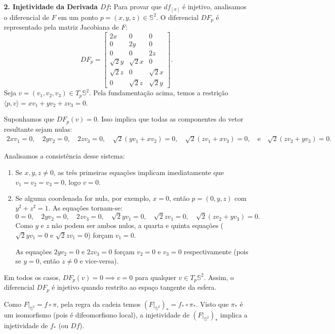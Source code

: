 {	\textbf{2. Injetividade da Derivada $Df$:}
	Para provar que $df_{[x]}$ é injetivo, analisamos o diferencial de $F$ em um ponto $p = (x, y, z) \in \mathbb{S}^2$. O diferencial $DF_p$ é representado pela matriz Jacobiana de $F$:
	\begin{equation*}
		DF_p = \begin{bmatrix} 
			2x & 0 & 0 \\ 
			0 & 2y & 0 \\ 
			0 & 0 & 2z \\ 
			\sqrt{2}y & \sqrt{2}x & 0 \\ 
			\sqrt{2}z & 0 & \sqrt{2}x \\ 
			0 & \sqrt{2}z & \sqrt{2}y 
		\end{bmatrix}.
	\end{equation*}
	Seja $v = (v_1, v_2, v_3) \in T_p \mathbb{S}^2$. Pela fundamentação acima, temos a restrição $\langle p, v \rangle = xv_1 + yv_2 + zv_3 = 0$.
	
	Suponhamos que $DF_p(v) = 0$. Isso implica que todas as componentes do vetor resultante sejam nulas:
	\begin{align*}
		2xv_1 = 0, \quad 2yv_2 = 0, \quad 2zv_3 = 0, \quad \sqrt{2}(yv_1 + xv_2) = 0, \quad \sqrt{2}(zv_1 + xv_3) = 0, \quad \text{e} \quad \sqrt{2}(zv_2 + yv_3) = 0.
	\end{align*}
	
	Analisamos a consistência desse sistema:
	\begin{enumerate}
		\item Se $x, y, z \neq 0$, as três primeiras equações implicam imediatamente que $v_1 = v_2 = v_3 = 0$, logo $v = 0$.
		\item Se alguma coordenada for nula, por exemplo, $x = 0$, então $p = (0, y, z)$ com $y^2 + z^2 = 1$. As equações tornam-se:
		\begin{equation*}
			0 = 0, \quad 2yv_2 = 0, \quad 2zv_3 = 0, \quad \sqrt{2}yv_1 = 0, \quad \sqrt{2}zv_1 = 0, \quad \sqrt{2}(zv_2 + yv_3) = 0.
		\end{equation*}
		Como $y$ e $z$ não podem ser ambos nulos, a quarta e quinta equações ($\sqrt{2}yv_1 = 0$ e $\sqrt{2}zv_1 = 0$) forçam $v_1 = 0$. 
		
		As equações $2yv_2 = 0$ e $2zv_3 = 0$ forçam $v_2 = 0$ e $v_3 = 0$ respectivamente (pois se $y=0$, então $z \neq 0$ e vice-versa).
	\end{enumerate}
	Em todos os casos, $DF_p(v) = 0 \implies v = 0$ para qualquer $v \in T_p \mathbb{S}^2$. Assim, o diferencial $DF_p$ é injetivo quando restrito ao espaço tangente da esfera.
	
	Como $F|_{\mathbb{S}^2} = f \circ \pi$, pela regra da cadeia temos $(F|_{\mathbb{S}^2})_* = f_* \circ \pi_*$. Visto que $\pi_*$ é um isomorfismo (pois é difeomorfismo local), a injetividade de $(F|_{\mathbb{S}^2})_*$ implica a injetividade de $f_*$ (ou $Df$).
}

